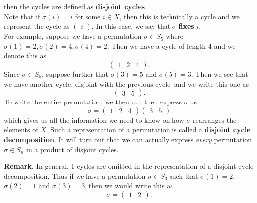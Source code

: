 \documentclass[12pt,letterpaper]{algebra_book}
\theoremstyle{definition}
\begin{document}
\begin{definition}
        then the cycles are defined as
        \textbf{disjoint cycles}.
        \\

        Note that if $\sigma(i) = i$ for some $i \in X$, then this is
        technically a cycle and we represent the cycle as $            \begin{pmatrix}
            i
        \end{pmatrix}.$ In this case, we say that $\sigma$ \textbf{fixes} $i$.
        \\

        For example, suppose we have a permutation $\sigma \in S_5$
        where $\sigma(1) = 2, \sigma(2) = 4, \sigma(4) = 2$. Then we
        have a cycle of length 4 and we denote this as 
        \[
            \begin{pmatrix}
                1 & 2 & 4
            \end{pmatrix}.
        \]
        Since $\sigma \in S_5$, suppose further
        that $\sigma(3) = 5$ and $\sigma(5) = 3$. Then we see that we
        have another cycle, disjoint with the previous cycle, and we write this one as
        \[
            \begin{pmatrix}
                3 & 5
            \end{pmatrix}.
        \]
        To write the entire permutation, we then can then express
        $\sigma$ as 
        \[
            \sigma =  \begin{pmatrix}
                1 & 2 & 4
            \end{pmatrix}
            \begin{pmatrix}
                3 & 5
            \end{pmatrix}
        \]
        which gives us all the information we need to know on how
        $\sigma$ rearranges the elements of $X$. Such a representation
        of a permutation is called a \textbf{disjoint cycle decomposition}. 
        It will turn out that
        we can actually express \textit{every} permutation $\sigma \in
        S_n$ in a product of disjoint cycles.
    \end{definition}
    \textbf{Remark.}
    In general, 1-cycles are omitted in the representation of a
    disjoint cycle decomposition. Thus if we have a permutation
    $\sigma \in S_3$ such that $\sigma(1) = 2$, $\sigma(2) = 1$ and
    $\sigma(3) = 3$, then we would write this as 
    \[
        \sigma = \begin{pmatrix}
            1 & 2
        \end{pmatrix}.
    \]
\end{document}
